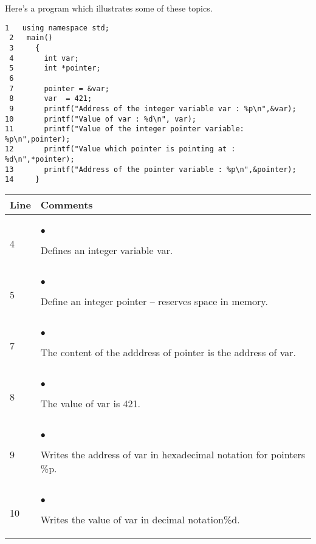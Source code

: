 Here's a program which illustrates some of these topics.
\lstset{language=c++}
\begin{lstlisting}[title={\url{http://folk.uio.no/mhjensen/compphys/programs/chapter02/cpp/program7.cpp}}]
 1   using namespace std;
 2   main()  
 3     {  
 4       int var;                    
 5       int *pointer;  
 6  
 7       pointer = &var;  
 8       var  = 421;  
 9       printf("Address of the integer variable var : %p\n",&var);
10       printf("Value of var : %d\n", var);
11       printf("Value of the integer pointer variable: %p\n",pointer);
12       printf("Value which pointer is pointing at :  %d\n",*pointer);
13       printf("Address of the pointer variable : %p\n",&pointer);
14     }
\end{lstlisting}

{\small
\begin{center}
%
\begin{tabular}{|ll|}\hline
\hfill Line \hfill
&\hspace*{\fill} Comments \hspace*{\fill}\\ \hline
&  \\[-2mm]
4 &$\bullet$
\begin{minipage}[t]{0.65\textwidth}
Defines an integer variable var.
\end{minipage}\\
5 &$\bullet$
\begin{minipage}[t]{0.65\textwidth}
Define an integer pointer  -- reserves space in memory.
\end{minipage}\\
7 &$\bullet$
\begin{minipage}[t]{0.65\textwidth}
The content of the adddress of  pointer is the  address of var.
\end{minipage}\\
8 &$\bullet$
\begin{minipage}[t]{0.65\textwidth}
The value of  var is 421.
\end{minipage}\\
9 &$\bullet$
\begin{minipage}[t]{0.65\textwidth}
Writes the address of  var in hexadecimal notation for pointers \%p.
\end{minipage}\\
10 &$\bullet$
\begin{minipage}[t]{0.65\textwidth}
Writes the value of  var in decimal notation\%d.
\end{minipage}\\[1ex]
\hline
\end{tabular}
\end{center}
} %
